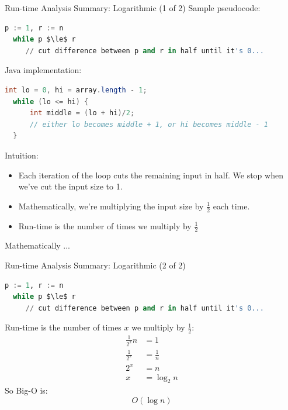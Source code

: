 \documentclass{beamer}
\begin{document}
\begin{frame}[fragile]{Run-time Analysis Summary: Logarithmic (1 of 2)}
\vspace{-.05in}
Sample pseudocode:
\vspace{-.05in}
\begin{lstlisting}[language=Python,mathescape]
  p := 1, r := n
  while p $\le$ r
     // cut difference between p and r in half until it's 0...
\end{lstlisting}
\vspace{-.05in}
Java implementation:
\vspace{-.05in}
\begin{lstlisting}[language=Java]
  int lo = 0, hi = array.length - 1;
  while (lo <= hi) {
      int middle = (lo + hi)/2;
      // either lo becomes middle + 1, or hi becomes middle - 1
  }
\end{lstlisting}
\vspace{-.05in}
Intuition:
\vspace{-.05in}
\begin{itemize}
\item Each iteration of the loop cuts the remaining input in half.  We stop when we've cut the input size to 1.
\item Mathematically, we're multiplying the input size by $\frac{1}{2}$ each time.
\item Run-time is the number of times we multiply by $\frac{1}{2}$
\end{itemize}
Mathematically ...
\end{frame}

\begin{frame}[fragile]{Run-time Analysis Summary: Logarithmic (2 of 2)}

\vspace{-.05in}
\begin{lstlisting}[language=Python,mathescape]
  p := 1, r := n
  while p $\le$ r
     // cut difference between p and r in half until it's 0...
\end{lstlisting}
Run-time is the number of times $x$ we multiply by $\frac{1}{2}$:
\begin{align*}
\frac{1}{2^x}n  & = 1\\
\frac{1}{2^x}   & = \frac{1}{n}\\
2^x             & = n\\
x               & = \log_2 n
\end{align*}
So Big-O is:
\[
O(\log n)
\]

\end{frame}
\end{document}
